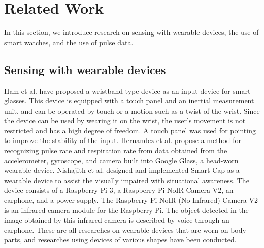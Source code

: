 \documentclass[sigchi,authordraft]{acmart}
\begin{document}
\section{Related Work}
\label{sec:related}
In this section, we introduce research on sensing with wearable devices, the use of smart watches, and the use of pulse data.

\subsection{Sensing with wearable devices}
Ham et al.\cite{smart_wristband} have proposed a wristband-type device as an input device for smart glasses. This device is equipped with a touch panel and an inertial measurement unit, and can be operated by touch or a motion such as a twist of the wrist. Since the device can be used by wearing it on the wrist, the user's movement is not restricted and has a high degree of freedom. A touch panel was used for pointing to improve the stability of the input.
Hernandez et al.\cite{bioglass} propose a method for recognizing pulse rate and respiration rate from data obtained from the accelerometer, gyroscope, and camera built into Google Glass, a head-worn wearable device.
Nishajith et al.\cite{smart_cap} designed and implemented Smart Cap as a wearable device to assist the visually impaired with situational awareness. The device consists of a Raspberry Pi 3, a Raspberry Pi NoIR Camera V2, an earphone, and a power supply. The Raspberry Pi NoIR (No Infrared) Camera V2 is an infrared camera module for the Raspberry Pi. The object detected in the image obtained by this infrared camera is described by voice through an earphone.
These are all researches on wearable devices that are worn on body parts, and researches using devices of various shapes have been conducted.\par
\end{document}
